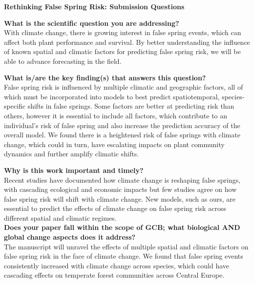 \documentclass{article}\usepackage[]{graphicx}\usepackage[]{color}
\begin{document}
\nobibliography*
\noindent \textbf{\Large{Rethinking False Spring Risk: Submission Questions}}\\
\vspace{3ex}

\noindent \textbf{What is the scientific question you are addressing?} \\

\noindent With climate change, there is growing interest in false spring events, which can affect both plant performance and survival. By better understanding the influence of known spatial and climatic factors for predicting false spring risk, we will be able to advance forecasting in the field.  %

\noindent \textbf{What is/are the key finding(s) that answers this question?} \\

\noindent False spring risk is influenced by multiple climatic and geographic factors, all of which must be incorporated into models to best predict spatiotemporal, species-specific shifts in false springs. Some factors are better at predicting risk than others, however it is essential to include all factors, which contribute to an individual's risk of false spring and also increase the prediction accuracy of the overall model. We found there is a heightened risk of false springs with climate change, which could in turn, have escalating impacts on plant community dynamics and further amplify climatic shifts.  

\noindent \textbf{Why is this work important and timely?}\\

\noindent Recent studies have documented how climate change is reshaping false springs, with cascading ecological and economic impacts but few studies agree on how false spring risk will shift with climate change. New models, such as ours, are essential to predict the effects of climate change on false spring risk across different spatial and climatic regimes. \\

\noindent \textbf{ Does your paper fall within the scope of GCB; what biological AND global change aspects does it address?}\\

\noindent The manuscript will unravel the effects of multiple spatial and climatic factors on false spring risk in the face of climate change. We found that false spring events consistently increased with climate change across species, which could have cascading effects on temperate forest communities across Central Europe. \\ %
\end{document}
